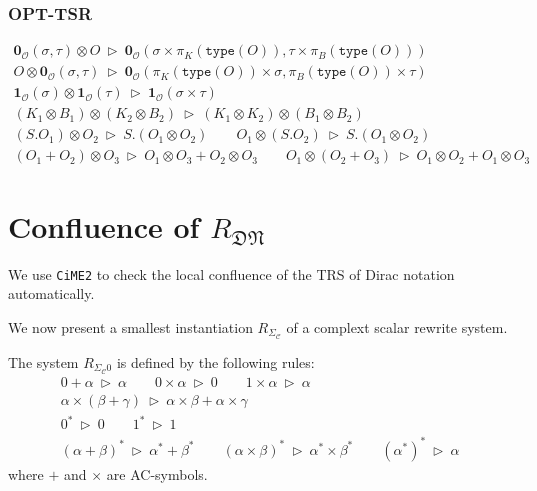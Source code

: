 \documentclass[manuscript, review, timestamp]{acmart}
\newcommand*{\type}{\texttt{type}}
\newcommand*{\reduce}{\ \triangleright\ }
\begin{document}
\subsubsection*{\textsf{OPT-TSR}}
\begin{gather*}
  \mathbf{0}_\mathcal{O}(\sigma, \tau) \otimes O \reduce \mathbf{0}_\mathcal{O}(\sigma \times \pi_K(\type(O)), \tau \times \pi_B(\type(O)))
  \\
  O \otimes \mathbf{0}_\mathcal{O}(\sigma, \tau) \reduce \mathbf{0}_\mathcal{O}(\pi_K(\type(O)) \times \sigma, \pi_B(\type(O)) \times \tau) \\
  \mathbf{1}_\mathcal{O}(\sigma) \otimes \mathbf{1}_\mathcal{O}(\tau) \reduce \mathbf{1}_\mathcal{O}(\sigma \times \tau) \\
  (K_1 \otimes B_1) \otimes (K_2 \otimes B_2) \reduce (K_1 \otimes K_2) \otimes (B_1 \otimes B_2) \\
  (S.O_1) \otimes O_2 \reduce S.(O_1 \otimes O_2)
  \qquad
  O_1 \otimes (S.O_2) \reduce S.(O_1 \otimes O_2) \\
  (O_1 + O_2) \otimes O_3 \reduce O_1 \otimes O_3 + O_2 \otimes O_3
  \qquad
  O_1 \otimes (O_2 + O_3) \reduce O_1 \otimes O_2 + O_1 \otimes O_3
\end{gather*}


\section{Confluence of $R_\mathfrak{DN}$}

We use \texttt{CiME2} to check the local confluence of the TRS of Dirac notation automatically.

We now present a smallest instantiation $R_{\Sigma_\mathcal{C}}$ of a complext scalar rewrite system. 

\begin{definition}
  The system $R_{\Sigma_\mathcal{C}0}$ is defined by the following rules:
  \begin{gather*}
    0 + \alpha \reduce \alpha
    \qquad
    0 \times \alpha \reduce 0
    \qquad
    1 \times \alpha \reduce \alpha \\
    \alpha \times (\beta + \gamma) \reduce \alpha \times \beta + \alpha \times \gamma \\
    0^* \reduce 0
    \qquad
    1^* \reduce 1 \\
    (\alpha + \beta)^* \reduce \alpha^* + \beta^*
    \qquad
    (\alpha \times \beta)^* \reduce \alpha^* \times \beta^*
    \qquad
    (\alpha^*)^* \reduce \alpha
  \end{gather*}
  where $+$ and $\times$ are AC-symbols.
\end{definition}
\end{document}
